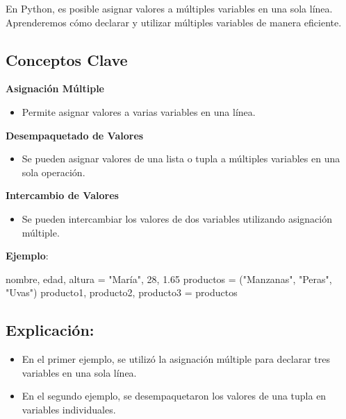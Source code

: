 \documentclass[
  a4paper,
  DIV=11,
  numbers=noendperiod,
  onepage,
  openany]{scrreprt}
\newenvironment{Shaded}{\begin{snugshade}}{\end{snugshade}}
\newcommand{\DecValTok}[1]{\textcolor[rgb]{0.68,0.00,0.00}{#1}}
\newcommand{\FloatTok}[1]{\textcolor[rgb]{0.68,0.00,0.00}{#1}}
\newcommand{\NormalTok}[1]{\textcolor[rgb]{0.00,0.23,0.31}{#1}}
\newcommand{\OperatorTok}[1]{\textcolor[rgb]{0.37,0.37,0.37}{#1}}
\newcommand{\StringTok}[1]{\textcolor[rgb]{0.13,0.47,0.30}{#1}}
\providecommand{\tightlist}{%
  \setlength{\itemsep}{0pt}\setlength{\parskip}{0pt}}\usepackage{longtable,booktabs,array}
\begin{document}
En Python, es posible asignar valores a múltiples variables en una sola
línea. Aprenderemos cómo declarar y utilizar múltiples variables de
manera eficiente.

\subsection{Conceptos Clave}\label{conceptos-clave-5}

\textbf{Asignación Múltiple}

\begin{itemize}
\tightlist
\item
  Permite asignar valores a varias variables en una línea.
\end{itemize}

\textbf{Desempaquetado de Valores}

\begin{itemize}
\tightlist
\item
  Se pueden asignar valores de una lista o tupla a múltiples variables
  en una sola operación.
\end{itemize}

\textbf{Intercambio de Valores}

\begin{itemize}
\tightlist
\item
  Se pueden intercambiar los valores de dos variables utilizando
  asignación múltiple.
\end{itemize}

\textbf{Ejemplo}:

\begin{Shaded}
\begin{Highlighting}[]
\NormalTok{nombre, edad, altura }\OperatorTok{=} \StringTok{"María"}\NormalTok{, }\DecValTok{28}\NormalTok{, }\FloatTok{1.65}
\NormalTok{productos }\OperatorTok{=}\NormalTok{ (}\StringTok{"Manzanas"}\NormalTok{, }\StringTok{"Peras"}\NormalTok{, }\StringTok{"Uvas"}\NormalTok{)}
\NormalTok{producto1, producto2, producto3 }\OperatorTok{=}\NormalTok{ productos}
\end{Highlighting}
\end{Shaded}

\subsection{Explicación:}\label{explicaciuxf3n-3}

\begin{itemize}
\item
  En el primer ejemplo, se utilizó la asignación múltiple para declarar
  tres variables en una sola línea.
\item
  En el segundo ejemplo, se desempaquetaron los valores de una tupla en
  variables individuales.
\end{itemize}
\end{document}
